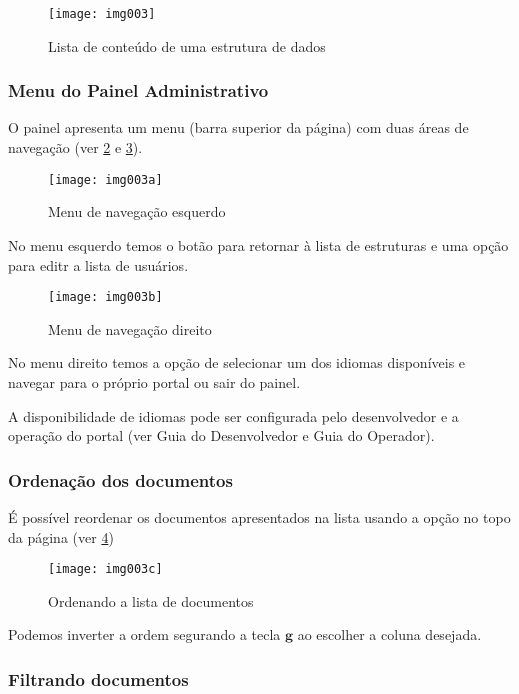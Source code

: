 \begin{figure}[!ht]
    \centering
    \texttt{[image: img003]}
    \caption{Lista de conteúdo de uma estrutura de dados}\label{RS0006:fig:img003}
\end{figure}

\subsubsection{Menu do Painel Administrativo}

O painel apresenta um menu (barra superior da página) com duas áreas de navegação (ver \cref{RS0006:fig:img003a} e \cref{RS0006:fig:img003b}).

\begin{figure}[!ht]
    \centering
    \texttt{[image: img003a]}
    \caption{Menu de navegação esquerdo}\label{RS0006:fig:img003a}
\end{figure}

No menu esquerdo temos o botão para retornar à lista de estruturas e uma opção para editr a lista de usuários.

\begin{figure}[!ht]
    \centering
    \texttt{[image: img003b]}
    \caption{Menu de navegação direito}\label{RS0006:fig:img003b}
\end{figure}

No menu direito temos a opção de selecionar um dos idiomas disponíveis e navegar para o próprio portal ou sair do painel.

A disponibilidade de idiomas pode ser configurada pelo desenvolvedor e a operação do portal (ver Guia do Desenvolvedor e Guia do Operador).

\subsubsection{Ordenação dos documentos}

É possível reordenar os documentos apresentados na lista usando a opção no topo da página (ver \cref{RS0006:fig:img003c})

\begin{figure}[!ht]
    \centering
    \texttt{[image: img003c]}
    \caption{Ordenando a lista de documentos}\label{RS0006:fig:img003c}
\end{figure}

Podemos inverter a ordem segurando a tecla $\bm{g}$ ao escolher a coluna desejada.

\subsubsection{Filtrando documentos}

